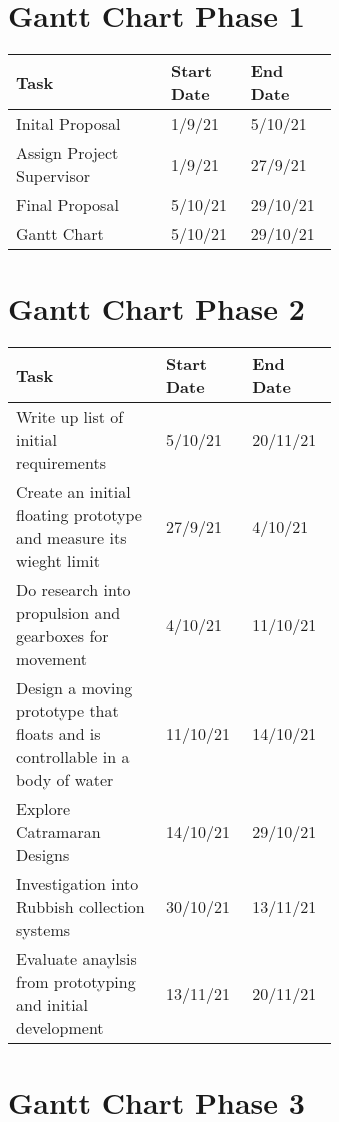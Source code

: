 \documentclass [12pt]{article}
\begin{document}
\section{Gantt Chart Phase 1}\label{app:phase_1}

\begin{table}[H]
\centering
\begin{tabular}{||p{0.4\linewidth}|p{0.12\linewidth}|p{0.12\linewidth}||}
\hline
Task & Start Date & End Date \\
\hline
Inital Proposal & 1/9/21 & 5/10/21 \\
\hline
Assign Project Supervisor & 1/9/21 & 27/9/21 \\
\hline
Final Proposal & 5/10/21 & 29/10/21 \\
\hline
Gantt Chart & 5/10/21 & 29/10/21 \\
\hline
\end{tabular}
\end{table}

\section{Gantt Chart Phase 2}\label{app:phase_2}

\begin{table}[H]
\centering
\begin{tabular}{||p{0.4\linewidth}|p{0.12\linewidth}|p{0.12\linewidth}||}
\hline
Task & Start Date & End Date \\
\hline
Write up list of initial requirements & 5/10/21 & 20/11/21 \\
\hline
Create an initial floating prototype and measure its wieght limit &	27/9/21 & 4/10/21 \\
\hline
Do research into propulsion and gearboxes for movement & 4/10/21 & 11/10/21 \\
\hline
Design a moving prototype that floats and is controllable in a body of water & 11/10/21	& 14/10/21 \\
\hline
Explore Catramaran Designs & 14/10/21 & 29/10/21 \\
\hline
Investigation into  Rubbish collection systems & 30/10/21 & 13/11/21 \\
\hline
Evaluate anaylsis from prototyping and initial development & 13/11/21 & 20/11/21 \\
\hline
\end{tabular}
\end{table}

\section{Gantt Chart Phase 3}\label{app:phase_3}
\end{document}
